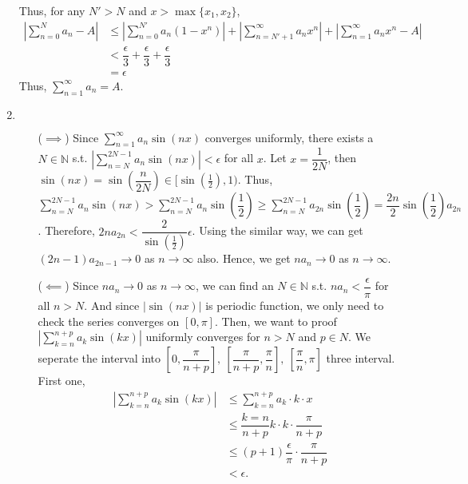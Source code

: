 \documentclass[12pt]{article}
\begin{document}
\begin{enumerate}
    Thus, for any $N' > N$ and $x > \max\{ x_1, x_2\}$,
    \begin{align*}
        |\sum_{n=0}^{N} a_n - A| &\leq |\sum_{n=0}^{N'} a_n(1-x^n)| + |\sum_{n=N'+1}^{\infty} a_n x^n | + |\sum_{n=1}^{\infty} a_nx^n - A|\\
        &< \dfrac{\epsilon}{3} + \dfrac{\epsilon}{3} + \dfrac{\epsilon}{3}\\
        &= \epsilon
    \end{align*}
    Thus, $\displaystyle\sum_{n=1}^{\infty} a_n = A$.

    \item $\ $\begin{enumerate}
        \item[($\implies$)] Since $\displaystyle\sum_{n=1}^{\infty} a_n \sin(nx)$ converges uniformly, 
        there exists a $N \in \mathbb{N}$ s.t. $|\displaystyle\sum_{n=N}^{2N-1} a_n \sin(nx)| < \epsilon$ for all $x$.
        Let $x = \dfrac{1}{2N}$, then $\sin(nx) = \sin(\dfrac{n}{2N})\in [\sin(\frac{1}{2}), 1)$.
        Thus, $\displaystyle\sum_{n=N}^{2N-1} a_n \sin(nx) > \displaystyle\sum_{n=N}^{2N-1} a_n \sin(\dfrac{1}{2}) \geq \displaystyle\sum_{n=N}^{2N-1} a_{2n} \sin(\dfrac{1}{2}) = \dfrac{2n}{2} \sin(\dfrac{1}{2})a_{2n}$.
        Therefore, $2n a_{2n} < \dfrac{2}{\sin(\frac{1}{2})}\epsilon$.
        Using the similar way, we can get $(2n-1) a_{2n-1}\to 0$ as $n\to\infty$ also.
        Hence, we get $na_n\to 0$ as $n\to\infty$.

        \item[($\impliedby$)] Since $na_n \to 0$ as $n\to \infty$, we can find an $N\in\mathbb{N}$ s.t.
        $na_n < \dfrac{\epsilon}{\pi}$ for all $n > N$.
        And since $|\sin(nx)|$ is periodic function, we only need to check the series converges on $[0, \pi]$.
        Then, we want to proof $|\displaystyle\sum_{k=n}^{n+p} a_k \sin(kx)|$ uniformly converges for $n > N$ and $p\in N$.
        We seperate the interval into $[0, \dfrac{\pi}{n+p}],\ [\dfrac{\pi}{n+p}, \dfrac{\pi}{n}],\ [\dfrac{\pi}{n}, \pi]$ three interval.
        First one, \begin{align*}
            |\sum_{k=n}^{n+p} a_k \sin(kx)| &\leq \sum_{k=n}^{n+p} a_k \cdot k \cdot x\\
            &\leq \dfrac{k=n}{n+p} k\cdot k \cdot \dfrac{\pi}{n+p}\\
            &\leq (p+1) \dfrac{\epsilon}{\pi}\cdot \dfrac{\pi}{n+p}\\
            & < \epsilon.
        \end{align*}


\end{enumerate}
\end{enumerate}
\end{document}
